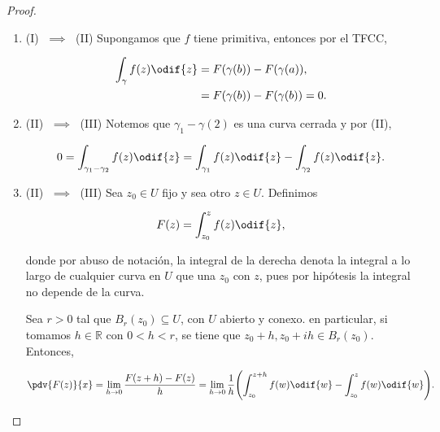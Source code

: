 \documentclass[../main.tex]{subfiles}
\begin{document}
\begin{proof}
    \vphantom{Texto para que no falle el ambiente de demostración chafa}
    \begin{enumerate}[label=""]
        \item (I) \(\;\implies\;\) (II) Supongamos que \(f\) tiene primitiva, entonces
            por el TFCC,

            \begin{align*}
                \int_{\gamma}^{}f(z)\odif{z} & = F(\gamma(b)) - F(\gamma(a)),     \\
                & = F(\gamma(b)) - F(\gamma(b)) = 0.
            \end{align*}
        \item (II) \(\;\implies\;\) (III) Notemos que \(\gamma_{1} -
            \gamma(2)\) es una curva
            cerrada y por (II),

            \begin{equation*}
                0 = \int_{\gamma_{1} - \gamma_{2}}^{}f(z)\odif{z} =
                \int_{\gamma_{1}}^{}f(z)\odif{z} -
                \int_{\gamma_{2}}^{}f(z)\odif{z}.
            \end{equation*}
        \item  (II) \(\;\implies\;\) (III) Sea \(z_{0} \in U\) fijo y sea otro \(z \in
            U\). Definimos

            \begin{equation}
                F(z) = \int_{z_{0}}^{z}f(z)\odif{z},
            \end{equation}

            donde por abuso de notación, la integral de la derecha denota la
            integral a lo largo de
            cualquier curva en \(U\) que una \(z_{0}\) con \(z\), pues por
            hipótesis la integral no
            depende de la curva.

            Sea \(r > 0\) tal que \(B_{r}(z_{0}) \subseteq U\), con \(U\)
            abierto y conexo. en
            particular, si tomamos \(h \in \mathbb{R}\) con \(0 < h < r\), se
            tiene que \(z_{0} + h,
            z_{0} + ih\in B_{r}(z_{0})\). Entonces,

            \begin{equation*}
                \pdv{F(z)}{x} = \lim_{h \to 0} \dfrac{F(z + h) - F(z)}{h} = \lim_{h\to
                0}\dfrac{1}{h}\Biggl(\int_{z_{0}}^{z + h}f(w)\odif{w} -
                \int_{z_{0}}^{z}f(w)\odif{w}\Biggr).
            \end{equation*}


\end{enumerate}
\end{proof}
\end{document}
